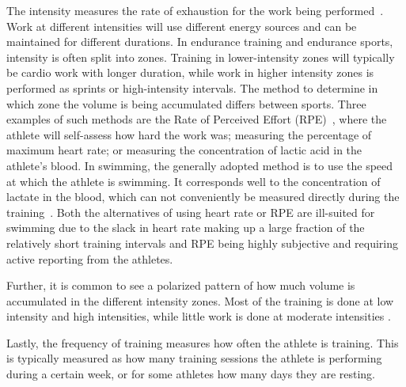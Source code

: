 The intensity measures the rate of exhaustion for the work being performed~\cite{smith2003framework}.
Work at different intensities will use different energy sources and can be maintained for different durations.
In endurance training and endurance sports, intensity is often split into zones.
Training in lower-intensity zones will typically be cardio work with longer duration, while work in higher intensity zones is performed as sprints or high-intensity intervals.
The method to determine in which zone the volume is being accumulated differs between sports.
Three examples of such methods are the Rate of Perceived Effort (RPE)~\cite{borg1982psychophysical}, where the athlete will self-assess how hard the work was; measuring the percentage of maximum heart rate; or measuring the concentration of lactic acid in the athlete's blood.
In swimming, the generally adopted method is to use the speed at which the athlete is swimming. It corresponds well to the concentration of lactate in the blood, which can not conveniently be measured directly during the training~\cite{chatard1999training}.
Both the alternatives of using heart rate or RPE are ill-suited for swimming due to the slack in heart rate making up a large fraction of the relatively short training intervals and RPE being highly subjective and requiring active reporting from the athletes.

Further, it is common to see a polarized pattern of how much volume is accumulated in the different intensity zones.
Most of the training is done at low intensity and high intensities, while little work is done at moderate intensities \cite{seiler2006quantifying}.

Lastly, the frequency of training measures how often the athlete is training.
This is typically measured as how many training sessions the athlete is performing during a certain week, or for some athletes how many days they are resting.

